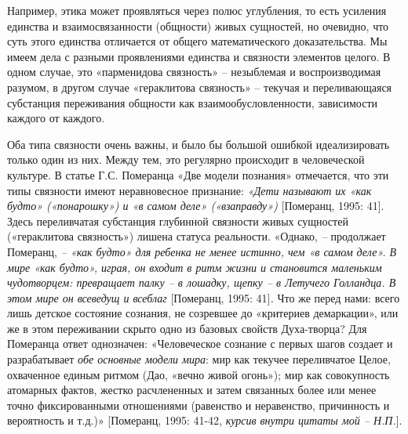     Например, этика может проявляться через полюс углубления, то есть усиления единства и взаимосвязанности (общности) живых сущностей, но очевидно, что суть этого единства отличается от общего математического доказательства. Мы имеем дела с разными проявлениями единства и связности элементов целого. В одном случае, это «парменидова связность» – незыблемая и воспроизводимая разумом, в другом случае «гераклитова связность» – текучая и переливающаяся субстанция переживания общности как взаимообусловленности, зависимости каждого от каждого.

    Оба типа связности очень важны, и было бы большой ошибкой идеализировать только один из них. Между тем, это регулярно происходит в человеческой культуре. В статье Г.С. Померанца «Две модели познания» отмечается, что эти типы связности имеют неравновесное признание: \textit{«Дети называют их «как будто» («понарошку») и «в самом деле» («взаправду»)} [Померанц, 1995: 41]. Здесь переливчатая субстанция глубинной связности живых сущностей («гераклитова связность») лишена статуса реальности. «Однако, \textit{– }продолжает Померанц, \textit{– «как будто» для ребенка не менее истинно, чем «в самом деле». В мире «как будто», играя, он входит в ритм жизни и становится маленьким чудотворцем: превращает палку – в лошадку, щепку – в Летучего Голландца. В этом мире он всеведущ и всеблаг} [Померанц, 1995: 41]\textit{. }Что же перед нами: всего лишь детское состояние сознания, не созревшее до «критериев демаркации», или же в этом переживании скрыто одно из базовых свойств Духа-творца? Для Померанца ответ однозначен: «Человеческое сознание с первых шагов создает и разрабатывает \textit{обе основные модели мира}: мир как текучее переливчатое Целое, охваченное единым ритмом (Дао, «вечно живой огонь»); мир как совокупность атомарных фактов, жестко расчлененных и затем связанных более или менее точно фиксированными отношениями (равенство и неравенство, причинность и вероятность и т.д.)» [Померанц, 1995: 41-42, \textit{курсив внутри цитаты мой – Н.П.}].

